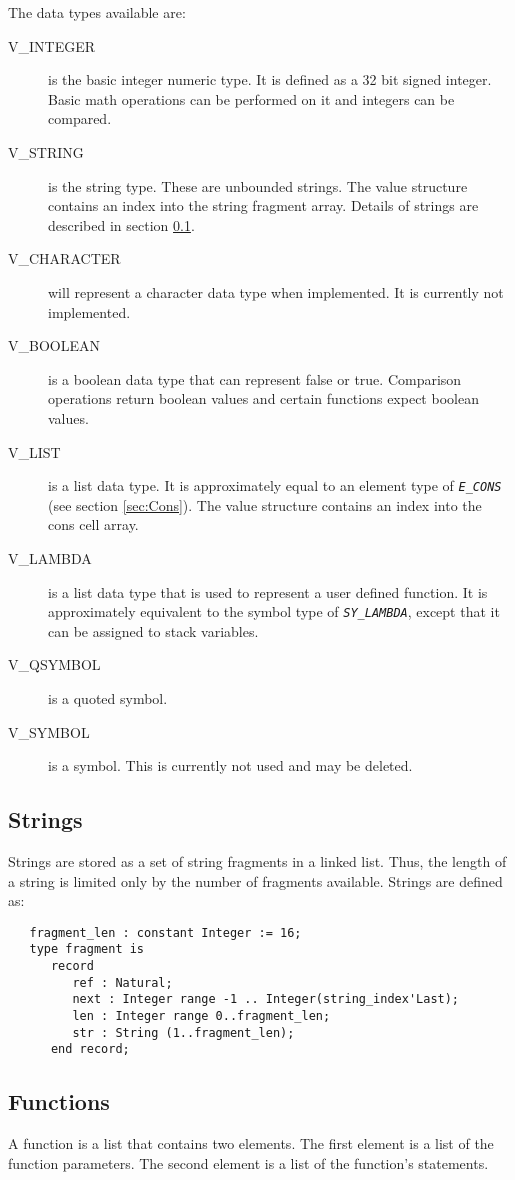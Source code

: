 \documentclass[10pt, openany]{book}
\newcommand{\constant}[1]{\emph{\texttt{#1}}}
\begin{document}
The data types available are:
\begin{description}
  \item[V\_INTEGER] is the basic integer numeric type.  It is defined as a 32 bit signed integer.  Basic math operations can be performed on it and integers can be compared.
  \item[V\_STRING] is the string type.  These are unbounded strings.  The value structure contains an index into the string fragment array.  Details of strings are described in section \ref{sec:strings}.
  \item[V\_CHARACTER] will represent a character data type when implemented.  It is currently not implemented.
  \item[V\_BOOLEAN] is a boolean data type that can represent false or true.  Comparison operations return boolean values and certain functions expect boolean values.
  \item[V\_LIST] is a list data type.  It is approximately equal to an element type of \constant{E\_CONS} (see section \ref{sec:Cons}).  The value structure contains an index into the cons cell array.
  \item[V\_LAMBDA] is a list data type that is used to represent a user defined function.  It is approximately equivalent to the symbol type of \constant{SY\_LAMBDA}, except that it can be assigned to stack variables.
  \item[V\_QSYMBOL] is a quoted symbol.
  \item[V\_SYMBOL] is a symbol.  This is currently not used and may be deleted.
\end{description}

\subsection{Strings}
\label{sec:strings}
Strings are stored as a set of string fragments in a linked list.  Thus, the length of a string is limited only by the number of fragments available.  Strings are defined as:
\begin{lstlisting}
   fragment_len : constant Integer := 16;
   type fragment is
      record
         ref : Natural;
         next : Integer range -1 .. Integer(string_index'Last);
         len : Integer range 0..fragment_len;
         str : String (1..fragment_len);
      end record;
\end{lstlisting}

\subsection{Functions}
\label{sec:Functions}
A function is a list that contains two elements.  The first element is a list of the function parameters.  The second element is a list of the function's statements.
\end{document}
